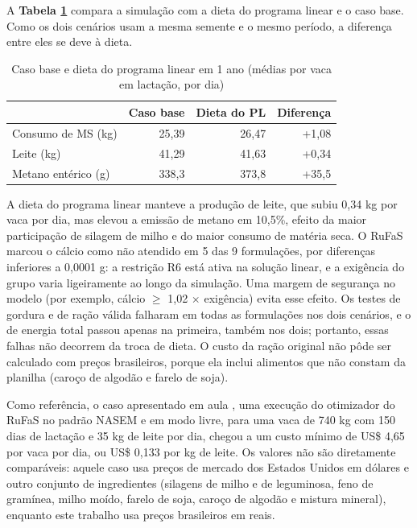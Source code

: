 \documentclass[a4paper,12pt]{article}
\begin{document}
A \textbf{Tabela \ref{tab:comparacao}} compara a simulação com a dieta do programa linear e o caso base. Como os dois cenários usam a mesma semente e o mesmo período, a diferença entre eles se deve à dieta.

\begin{table}[htbp]
    \centering
    \caption{Caso base e dieta do programa linear em 1 ano (médias por vaca em lactação, por dia)}
    \label{tab:comparacao}
    \begin{tabular}{lrrr}
        \toprule
        & \textbf{Caso base} & \textbf{Dieta do PL} & \textbf{Diferença} \\
        \midrule
        \rowcolor{gray!15}
        Consumo de MS (kg) & 25,39 & 26,47 & +1,08 \\
        Leite (kg) & 41,29 & 41,63 & +0,34 \\
        \rowcolor{gray!15}
        Metano entérico (g) & 338,3 & 373,8 & +35,5 \\
        \bottomrule
    \end{tabular}
\end{table}

A dieta do programa linear manteve a produção de leite, que subiu 0,34 kg por vaca por dia, mas elevou a emissão de metano em 10,5\%, efeito da maior participação de silagem de milho e do maior consumo de matéria seca. O RuFaS marcou o cálcio como não atendido em 5 das 9 formulações, por diferenças inferiores a 0,0001 g: a restrição R6 está ativa na solução linear, e a exigência do grupo varia ligeiramente ao longo da simulação. Uma margem de segurança no modelo (por exemplo, cálcio $\geq$ 1,02 $\times$ exigência) evita esse efeito. Os testes de gordura e de ração válida falharam em todas as formulações nos dois cenários, e o de energia total passou apenas na primeira, também nos dois; portanto, essas falhas não decorrem da troca de dieta. O custo da ração original não pôde ser calculado com preços brasileiros, porque ela inclui alimentos que não constam da planilha (caroço de algodão e farelo de soja).

Como referência, o caso apresentado em aula \cite{slides:rufas}, uma execução do otimizador do RuFaS no padrão NASEM e em modo livre, para uma vaca de 740 kg com 150 dias de lactação e 35 kg de leite por dia, chegou a um custo mínimo de US\$ 4,65 por vaca por dia, ou US\$ 0,133 por kg de leite. Os valores não são diretamente comparáveis: aquele caso usa preços de mercado dos Estados Unidos em dólares e outro conjunto de ingredientes (silagens de milho e de leguminosa, feno de gramínea, milho moído, farelo de soja, caroço de algodão e mistura mineral), enquanto este trabalho usa preços brasileiros em reais.
\end{document}
